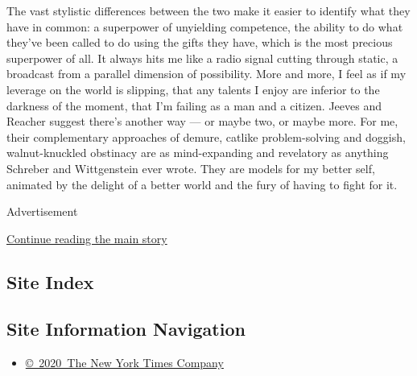 The vast stylistic differences between the two make it easier to
identify what they have in common: a superpower of unyielding
competence, the ability to do what they've been called to do using the
gifts they have, which is the most precious superpower of all. It always
hits me like a radio signal cutting through static, a broadcast from a
parallel dimension of possibility. More and more, I feel as if my
leverage on the world is slipping, that any talents I enjoy are inferior
to the darkness of the moment, that I'm failing as a man and a citizen.
Jeeves and Reacher suggest there's another way --- or maybe two, or
maybe more. For me, their complementary approaches of demure, catlike
problem-solving and doggish, walnut-knuckled obstinacy are as
mind-expanding and revelatory as anything Schreber and Wittgenstein ever
wrote. They are models for my better self, animated by the delight of a
better world and the fury of having to fight for it.

Advertisement

\protect\hyperlink{after-bottom}{Continue reading the main story}

\hypertarget{site-index}{%
\subsection{Site Index}\label{site-index}}

\hypertarget{site-information-navigation}{%
\subsection{Site Information
Navigation}\label{site-information-navigation}}

\begin{itemize}
\tightlist
\item
  \href{https://help.nytimes3xbfgragh.onion/hc/en-us/articles/115014792127-Copyright-notice}{©~2020~The
  New York Times Company}
\end{itemize}

